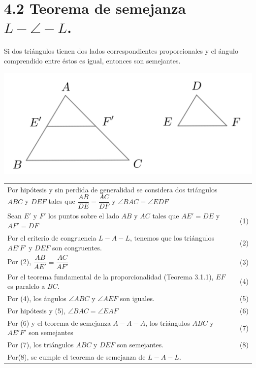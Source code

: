 \documentclass[12pt,a4paper, oneside]{book}
\begin{document}
\section{4.2 Teorema de semejanza $L- \angle -L$.}
Si dos triángulos tienen dos lados correspondientes proporcionales y el ángulo comprendido entre éstos es igual, entonces son semejantes.
\\ 
\begin{center}
\includegraphics[scale=0.8]{Imagenes/semejanza.png} 
\end{center}
\begin{tabular}{p{15.9cm} p{1cm}}
Por hipótesis y sin perdida de generalidad se considera dos triángulos $ABC$ y $DEF$ tales que $\dfrac{AB}{DE}=\dfrac{AC}{DF}$ y $\angle BAC=\angle EDF$
\\Sean $E'$ y $F'$ los puntos sobre el lado $AB$ y $AC$ tales que $AE'=DE$ y $AF'=DF$& (1)
\\Por el criterio de congruencia $L-A-L$, tenemos que los triángulos $AE'F'$ y $DEF$ son congruentes. &\medskip(2)
\\Por (2), $\dfrac{AB}{AE'}=\dfrac{AC}{AF'}$ &(3)
\\Por el teorema fundamental de la proporcionalidad (Teorema 3.1.1), $EF$ es paralelo a $BC$. &(4) 
\\Por (4), los ángulos $\angle ABC$ y $\angle AEF$ son iguales. &(5)
\\Por hipótesis y (5), $\angle BAC= \angle EAF$&(6)
\\Por (6) y el teorema de semejanza $A-A-A$, los triángulos $ABC$ y $AE'F'$ son semejantes&(7)
\\Por (7), los triángulos $ABC$ y $DEF$ son semejantes. &(8)
\\Por(8), se cumple el teorema de semejanza de $L-A-L$.
\end{tabular}
\end{document}
